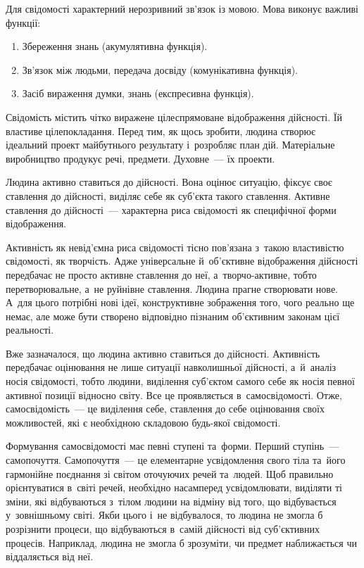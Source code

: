 \documentclass[a5paper,oneside,DIV=12,12pt,headings=small]{scrartcl}
\begin{document}
		Для свідомості характерний нерозривний зв'я\-зок із мовою. Мова виконує важливі функції:
		\begin{enumerate}
			\item Збереження знань (акумулятивна функція). 
			\item Зв'я\-зок між людьми, передача досвіду (комунікативна функція). 
			\item Засіб вираження думки, знань (експресивна функція).
		\end{enumerate}

		Свідомість містить чітко виражене цілеспрямоване відображення дійсності. Їй властиве цілепокладання. Перед тим, як щось зробити, людина створює ідеальний проект майбутнього результату і~розробляє план дій. Матеріальне виробництво продукує речі, предмети. Духовне~— їх проекти.

		Людина активно ставиться до дійсності. Вона оцінює ситуацію, фіксує своє ставлення до дійсності, виділяє себе як суб'\-єкта такого ставлення. Активне ставлення до дійсності~— характерна риса свідомості як специфічної форми відображення.

		Активність як не\-від'\-єм\-на риса свідомості тісно пов'\-я\-за\-на з~такою властивістю свідомості, як творчість. Адже універсальне й~об'\-єк\-тив\-не відображення дійсності передбачає не просто активне ставлення до неї, а~творчо-активне, тобто перетворювальне, а~не руйнівне ставлення. Людина прагне створювати нове. А~для цього потрібні нові ідеї, конструктивне зображення того, чого реально ще немає, але може бути створено відповідно пізнаним об'\-єк\-тив\-ним законам цієї реальності.

		Вже зазначалося, що людина активно ставиться до дійсності. Активність передбачає оцінювання не лише ситуації навколишньої дійсності, а~й~аналіз носія свідомості, тобто людини, виділення суб'\-єктом самого себе як носія певної активної позиції відносно світу. Все це проявляється в~самосвідомості. Отже, самосвідомість~— це виділення себе, ставлення до себе оцінювання своїх можливостей, які є необхідною складовою будь-якої свідомості.

		Формування самосвідомості має певні ступені та~форми. Перший ступінь~— самопочуття. Самопочуття~— це елементарне усвідомлення свого тіла та~його гармонійне поєднання зі світом оточуючих речей та~людей. Щоб правильно орієнтуватися в~світі речей, необхідно насамперед усвідомлювати, виділяти ті зміни, які відбуваються з~тілом людини на відміну від того, що відбувається у~зовнішньому світі. Якби цього і~не відбувалося, то людина не змогла б розрізнити процеси, що відбуваються в~самій дійсності від суб'\-єк\-тив\-них процесів. Наприклад, людина не змогла б зрозуміти, чи предмет наближається чи віддаляється від неї.
\end{document}
